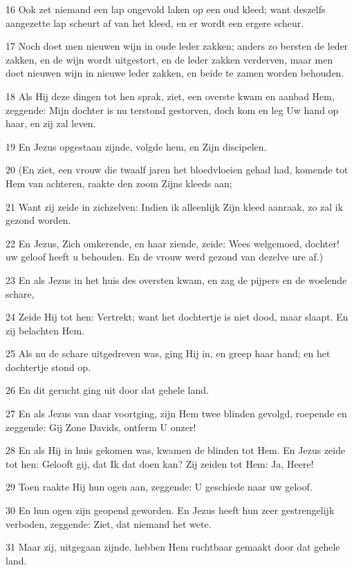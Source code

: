 \par 16 Ook zet niemand een lap ongevold laken op een oud kleed; want deszelfs aangezette lap scheurt af van het kleed, en er wordt een ergere scheur.
\par 17 Noch doet men nieuwen wijn in oude leder zakken; anders zo bersten de leder zakken, en de wijn wordt uitgestort, en de leder zakken verderven, maar men doet nieuwen wijn in nieuwe leder zakken, en beide te zamen worden behouden.
\par 18 Als Hij deze dingen tot hen sprak, ziet, een overste kwam en aanbad Hem, zeggende: Mijn dochter is nu terstond gestorven, doch kom en leg Uw hand op haar, en zij zal leven.
\par 19 En Jezus opgestaan zijnde, volgde hem, en Zijn discipelen.
\par 20 (En ziet, een vrouw die twaalf jaren het bloedvloeien gehad had, komende tot Hem van achteren, raakte den zoom Zijns kleeds aan;
\par 21 Want zij zeide in zichzelven: Indien ik alleenlijk Zijn kleed aanraak, zo zal ik gezond worden.
\par 22 En Jezus, Zich omkerende, en haar ziende, zeide: Wees welgemoed, dochter! uw geloof heeft u behouden. En de vrouw werd gezond van dezelve ure af.)
\par 23 En als Jezus in het huis des oversten kwam, en zag de pijpers en de woelende schare,
\par 24 Zeide Hij tot hen: Vertrekt; want het dochtertje is niet dood, maar slaapt. En zij belachten Hem.
\par 25 Als nu de schare uitgedreven was, ging Hij in, en greep haar hand; en het dochtertje stond op.
\par 26 En dit gerucht ging uit door dat gehele land.
\par 27 En als Jezus van daar voortging, zijn Hem twee blinden gevolgd, roepende en zeggende: Gij Zone Davids, ontferm U onzer!
\par 28 En als Hij in huis gekomen was, kwamen de blinden tot Hem. En Jezus zeide tot hen: Gelooft gij, dat Ik dat doen kan? Zij zeiden tot Hem: Ja, Heere!
\par 29 Toen raakte Hij hun ogen aan, zeggende: U geschiede naar uw geloof.
\par 30 En hun ogen zijn geopend geworden. En Jezus heeft hun zeer gestrengelijk verboden, zeggende: Ziet, dat niemand het wete.
\par 31 Maar zij, uitgegaan zijnde, hebben Hem ruchtbaar gemaakt door dat gehele land.
